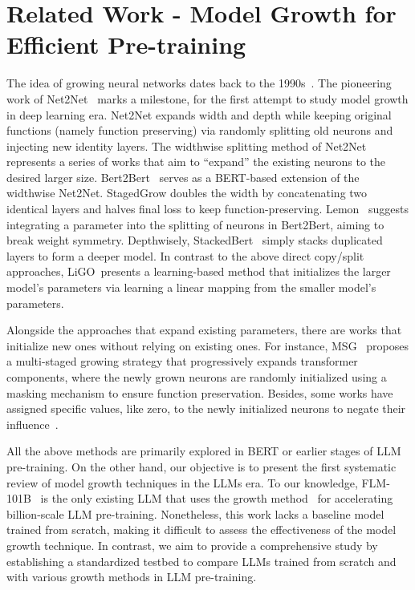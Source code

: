 \documentclass{article}
\begin{document}
\section{Related Work - Model Growth for Efficient Pre-training}\label{sec:related}
The idea of growing neural networks dates back to the 1990s~\cite{NIPS1989_69adc1e1, Fahlman1990TheRC, Gutstein2007KnowledgeTI}. 
The pioneering work of Net2Net~\citep{chen2015net2net} marks a milestone, for the first attempt to study model growth in deep learning era. Net2Net expands width and depth while keeping original functions (namely function preserving) via randomly splitting old neurons and injecting new identity layers. 
The widthwise splitting method of Net2Net represents a series of works that aim to ``expand'' the existing neurons to the desired larger size. 
Bert2Bert~\citep{chen2021bert2bert} serves as a BERT-based extension of the widthwise Net2Net. 
StagedGrow\cite{shen2022staged} doubles the width by concatenating two identical layers and halves final loss to keep function-preserving. 
Lemon~\citep{wang2023lemon} suggests integrating a parameter into the splitting of neurons in Bert2Bert, aiming to break weight symmetry. 
Depthwisely, StackedBert~\cite{gong2019efficient} simply stacks duplicated layers to form a deeper model. 
In contrast to the above direct copy/split approaches, LiGO~\citep{wang2023learning}presents a learning-based method that initializes the larger model's parameters via learning a linear mapping from the smaller model's parameters. 

Alongside the approaches that expand existing parameters, there are works that initialize new ones without relying on existing ones. For instance, MSG~\citep{yao2024masked} proposes a multi-staged growing strategy that progressively expands transformer components, where the newly grown neurons are randomly initialized using a masking mechanism to ensure function preservation. Besides, some works have assigned specific values, like zero, to the newly initialized neurons to negate their influence~\citep{evci2022gradmax,wang2023lemon}.

All the above methods are primarily explored in BERT or earlier stages of LLM pre-training. On the other hand, our objective is to present the first systematic review of model growth techniques in the LLMs era. To our knowledge, FLM-101B~\cite{li2023flm101b} is the only existing LLM that uses the growth method~\cite{yao2024masked} for accelerating billion-scale LLM pre-training. 
Nonetheless, this work lacks a baseline model trained from scratch, making it difficult to assess the effectiveness of the model growth technique. In contrast, we aim to provide a comprehensive study by establishing a standardized testbed to compare LLMs trained from scratch and with various growth methods in LLM pre-training. 
\end{document}
